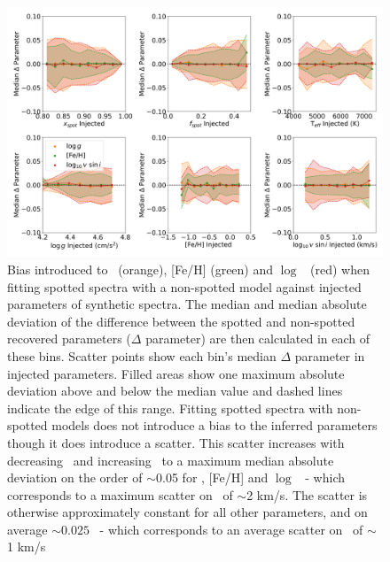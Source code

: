 \begin{figure}
    \includegraphics[width=\textwidth]{Figures/ss_chapter_figures/full_results.png}
    \caption[Bias introduced to \logg  \ (orange){,} \feh \ (green) and $\log$ \vsini\ (red) when fitting spotted spectra with a non-spotted model against injected parameters of synthetic spectra.]{Bias introduced to \logg  \ (orange), [Fe/H] (green) and $\log$ \vsini\ (red) when fitting spotted spectra with a non-spotted model against injected parameters of synthetic spectra.  The median and median absolute deviation of the difference between the spotted and non-spotted recovered parameters ($\Delta$ parameter) are then calculated in each of these bins.
    Scatter points show each bin's median $\Delta$ parameter in injected parameters. Filled areas show one maximum absolute deviation above and below the median value and dashed lines indicate the edge of this range.
    Fitting spotted spectra with non-spotted models does not introduce a bias to the inferred parameters though it does introduce a scatter. This scatter increases with decreasing \xspot\ and increasing \fspot\ to a maximum median absolute deviation on the order of $\sim$0.05 for \logg, [Fe/H] and $\log$ \vsini \ - which corresponds to a maximum scatter on \vsini \ of $\sim$2 km/s.
    The scatter is otherwise approximately constant for all other parameters, and on average $\sim 0.025$ \ - which corresponds to an average scatter on \vsini \ of $\sim$ 1 km/s }
    \label{fig:res_full}
\end{figure}


